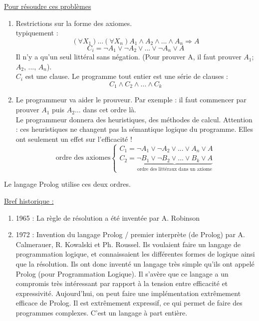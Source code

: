 \underline{Pour résoudre ces problèmes}
\begin{enumerate}
	\item Restrictions sur la forme des axiomes.\\
	typiquement : 
	$$(\forall X_{1}) ... (\forall X_{n}) A_{1} \wedge A_{2} \wedge ... \wedge A_{n} \Rightarrow A$$
	$$C_{i} = \neg A_{1} \vee \neg A_{2} \vee ... \vee \neg A_{n} \vee A$$
	Il n’y a qu’un seul littéral sans négation. (Pour prouver A, il faut prouver $A_{1}$; $A_{2}$, ..., $A_{n}$).\\
	$C_{i}$ est une clause. Le programme tout entier est une série de clauses :
	$$C_{1} \wedge C_{2} \wedge ... \wedge C_{k}$$
	\item Le programmeur va aider le prouveur.
	Par exemple : il faut commencer par prouver $A_{1}$ puis $A_{2}$... dans cet ordre là.\\
	Le programmeur donnera des heuristiques, des méthodes de calcul. Attention : ces heuristiques ne changent pas la sémantique logique du programme. Elles ont seulement un effet sur l'efficacité !
	$$\text{ordre des axiomes}\left \{
		\begin{array}{l}
		C_{1} = \neg A_{1} \vee \neg A_{2} \vee ... \vee A_{n} \vee A \\
	
		C_{2} = \underbrace{\neg B_{1} \vee \neg B_{2} \vee ... \vee B_{k} \vee A}_{\text{ordre des littéraux dans un axiome}}
		\end{array}
		\right.$$
	
\end{enumerate}

Le langage Prolog utilise ces deux ordres.

\underline{Bref historique :}
\begin{enumerate}
	\item 1965 : 	La règle de résolution a été inventée par A. Robinson
	\item 1972 :	Invention du langage Prolog / premier interprète (de Prolog) par A. Calmerauer, R. Kowalski et Ph. Roussel. 
Ils voulaient faire un langage de programmation logique, et connaissaient les différentes formes de logique ainsi que la résolution. Ils ont donc inventé un langage très simple qu'ils ont appelé Prolog (pour Programmation Logique).  Il s'avère que ce langage a un compromis très intéressant par rapport à la tension entre efficacité et expressivité.
Aujourd'hui, on peut faire une implémentation extrêmement efficace de Prolog. Il est extrêmement expressif, ce qui permet de faire des programmes complexes. C'est un langage à part entière.
\end{enumerate}

